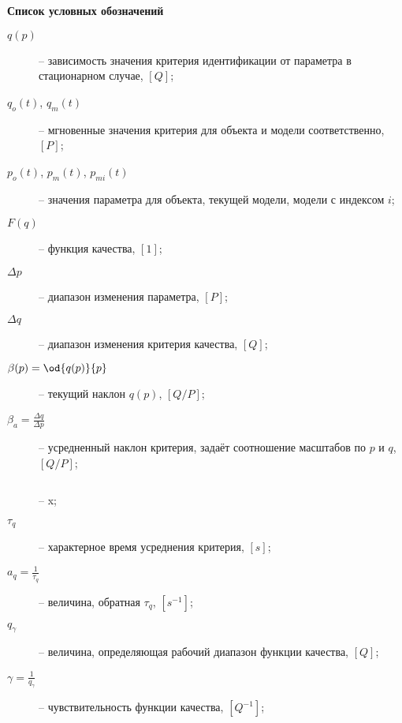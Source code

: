 \clearpage
{}

\begin{center}
  \textbf{Список условных обозначений}
\end{center}


\begin{description}

  \item[$q(p)$]  -- зависимость значения критерия идентификации от параметра в стационарном случае, $[Q]$;

  \item[$q_o(t)$, $q_m(t)$]  -- мгновенные значения критерия для объекта и модели соответственно, $[P]$;

  \item[$p_o(t)$, $p_m(t)$, $p_{mi}(t)$]  -- значения параметра для объекта, текущей модели, модели с индексом $i$;

  \item[$F(q) $]  -- функция качества, $[1]$;

  \item[$\Delta p$]  -- диапазон изменения параметра, $[P]$;

  \item[$\Delta q$]  -- диапазон изменения критерия качества, $[Q]$;

  \item[$\beta(p) = \od{q(p)}{p}$]  -- текущий наклон $q(p)$, $[Q/P]$;

  \item[$\beta_a = \frac{\Delta q}{\Delta p} $]  -- усредненный наклон критерия, задаёт соотношение масштабов по $p$ и $q$, $[Q/P]$;

  \item[$ $]  -- x;

  \item[$\tau_q$]  -- характерное время усреднения критерия, $[s]$;

  \item[$a_q = \frac{1}{\tau_q} $]  -- величина, обратная $\tau_q$, $[s^{-1}]$;

  \item[$q_\gamma $]  -- величина, определяющая рабочий диапазон функции качества, $[Q]$;

  \item[$\gamma = \frac{1}{q_\gamma} $]  -- чувствительность функции качества, $[Q^{-1}]$;


\end{description}
